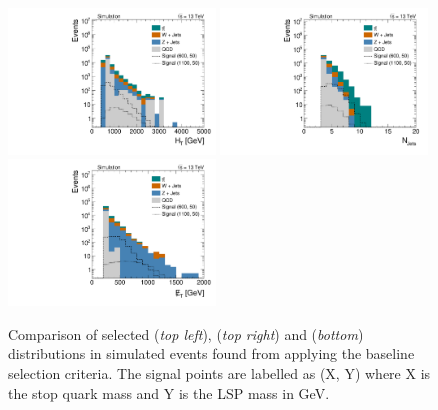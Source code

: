 \begin{figure}[!t]
  \centering
  \begin{minipage}[c]{1.\textwidth}
    \begin{center}
      \includegraphics[width=0.49\textwidth]{figures/Stop_DeltaPhiSelection_HThad.pdf}  
      \includegraphics[width=0.49\textwidth]{figures/Stop_DeltaPhiSelection_N_jets.pdf} \\
      \includegraphics[width=0.49\textwidth]{figures/Stop_DeltaPhiSelection_MET.pdf} 
    \end{center}
  \end{minipage}

  \caption{Comparison of selected \HT (\textit{top left}), \met (\textit{top right}) and \NJets (\textit{bottom}) distributions in simulated events found from applying the baseline selection criteria. The signal points are labelled as (X, Y) where X is the stop quark mass and Y is the LSP mass in GeV.}
  \label{fig:stop_baseline} 
\end{figure}
\\
